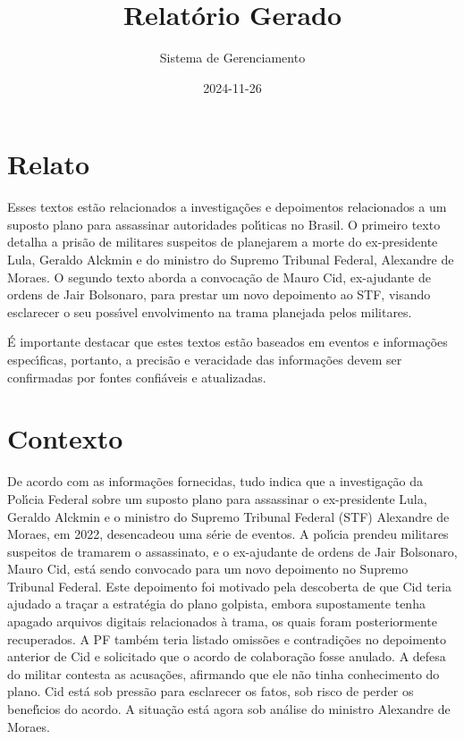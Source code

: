 \documentclass[article,11pt,oneside,a4paper,brazil,sumario=tradicional]{abntex2}%
\title{Relatório Gerado}%
\author{Sistema de Gerenciamento}%
\date{2024{-}11{-}26}%
\begin{document}
%
\normalsize%
\maketitle%
%
\frenchspacing%
\section{Relato}%
\label{sec:Relato}%
Esses textos est\~ao relacionados a investiga\c{c}\~oes e depoimentos relacionados a um suposto plano para assassinar autoridades pol{\'\i}ticas no Brasil. O primeiro texto detalha a pris\~ao de militares suspeitos de planejarem a morte do ex-presidente Lula, Geraldo Alckmin e do ministro do Supremo Tribunal Federal, Alexandre de Moraes. O segundo texto aborda a convoca\c{c}\~ao de Mauro Cid, ex-ajudante de ordens de Jair Bolsonaro, para prestar um novo depoimento ao STF, visando esclarecer o seu poss{\'\i}vel envolvimento na trama planejada pelos militares.

\'E importante destacar que estes textos est\~ao baseados em eventos e informa\c{c}\~oes espec{\'\i}ficas, portanto, a precis\~ao e veracidade das informa\c{c}\~oes devem ser confirmadas por fontes confi\'aveis e atualizadas.

%
\section{Contexto}%
\label{sec:Contexto}%
De acordo com as informa\c{c}\~oes fornecidas, tudo indica que a investiga\c{c}\~ao da Pol{\'\i}cia Federal sobre um suposto plano para assassinar o ex-presidente Lula, Geraldo Alckmin e o ministro do Supremo Tribunal Federal (STF) Alexandre de Moraes, em 2022, desencadeou uma s\'erie de eventos. A pol{\'\i}cia prendeu militares suspeitos de tramarem o assassinato, e o ex-ajudante de ordens de Jair Bolsonaro, Mauro Cid, est\'a sendo convocado para um novo depoimento no Supremo Tribunal Federal. Este depoimento foi motivado pela descoberta de que Cid teria ajudado a tra\c{c}ar a estrat\'egia do plano golpista, embora supostamente tenha apagado arquivos digitais relacionados \`a trama, os quais foram posteriormente recuperados. A PF tamb\'em teria listado omiss\~oes e contradi\c{c}\~oes no depoimento anterior de Cid e solicitado que o acordo de colabora\c{c}\~ao fosse anulado. A defesa do militar contesta as acusa\c{c}\~oes, afirmando que ele n\~ao tinha conhecimento do plano. Cid est\'a sob press\~ao para esclarecer os fatos, sob risco de perder os benef{\'\i}cios do acordo. A situa\c{c}\~ao est\'a agora sob an\'alise do ministro Alexandre de Moraes.
\end{document}
